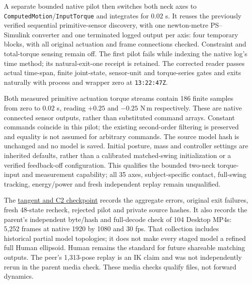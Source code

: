 \documentclass[11pt,a4paper]{article}
\begin{document}
A separate bounded native pilot then switches both neck axes to
\texttt{ComputedMotion}/\texttt{InputTorque} and integrates for $0.02$ s.
It reuses the previously verified sequential primitive-sensor discovery,
with one newton-metre PS--Simulink converter and one terminated logged output
per axis: four temporary blocks, with all original actuation and frame
connections checked. Constraint and total-torque sensing remain off.
The first pilot fails while indexing the native log's time method; its
natural-exit-one receipt is retained. The corrected reader passes actual
time-span, finite joint-state, sensor-unit and torque-series gates and exits
naturally with process and wrapper zero at \texttt{13:22:47Z}.

Both measured primitive actuation torque streams contain 186 finite samples
from zero to $0.02$ s, reading $+0.25$ and $-0.25$ N\,m respectively.
These are native connected sensor outputs, rather than substituted command
arrays. Constant commands coincide in this pilot; the existing second-order
filtering is preserved and equality is not assumed for arbitrary commands.
The source model hash is unchanged and no model is saved. Initial posture,
mass and controller settings are inherited defaults, rather than a calibrated
matched-swing initialization or a verified feedback-off configuration.
This qualifies the bounded two-neck torque-input and measurement capability;
all 35 axes, subject-specific contact, full-swing tracking, energy/power
and fresh independent replay remain unqualified.


The \href{tangent_c2_checkpoint_20261003.json}{tangent and C2 checkpoint}
records the aggregate errors, original exit failures, fresh 48-state recheck,
rejected pilot and private source hashes. It also records the parent's
independent byte/hash and full-decode check of 104 Desktop MP4s: 5,252 frames
at native 1920 by 1080 and 30 fps. That collection includes historical partial
model topologies; it does not make every staged model a refined full Human
ellipsoid. Human remains the standard for future shareable matching outputs.
The peer's 1,313-pose replay is an IK claim and was not independently rerun in
the parent media check. These media checks qualify files, not forward dynamics.
\end{document}
